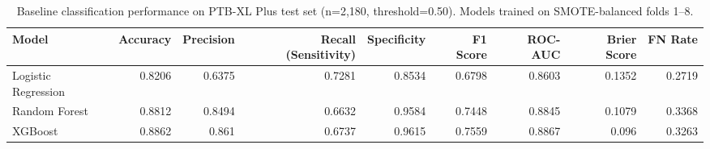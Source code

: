 \begin{table}[htbp]
  \centering
  \caption{Baseline classification performance on PTB-XL Plus test set (n=2,180, threshold=0.50). Models trained on SMOTE-balanced folds 1--8.}
  \label{tab:p1_classification}
  \begin{tabular}{lrrrrrrrr}
  \toprule
  Model & Accuracy & Precision & Recall (Sensitivity) & Specificity & F1 Score & ROC-AUC & Brier Score & FN Rate \\
  \midrule
  Logistic Regression & 0.8206 & 0.6375 & 0.7281 & 0.8534 & 0.6798 & 0.8603 & 0.1352 & 0.2719 \\
  Random Forest & 0.8812 & 0.8494 & 0.6632 & 0.9584 & 0.7448 & 0.8845 & 0.1079 & 0.3368 \\
  XGBoost & 0.8862 & 0.861 & 0.6737 & 0.9615 & 0.7559 & 0.8867 & 0.096 & 0.3263 \\
  \bottomrule
  \end{tabular}
\end{table}